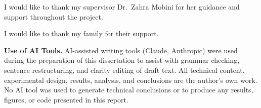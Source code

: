 I would like to thank my supervisor Dr.\ Zahra Mobini for her guidance and support throughout the project.

I would like to thank my family for their support.

\bigskip
\noindent\textbf{Use of AI Tools.}
AI-assisted writing tools (Claude, Anthropic) were used during the preparation of this
dissertation to assist with grammar checking, sentence restructuring, and clarity editing
of draft text. All technical content, experimental design, results, analysis, and conclusions
are the author's own work. No AI tool was used to generate technical conclusions or to
produce any results, figures, or code presented in this report.

